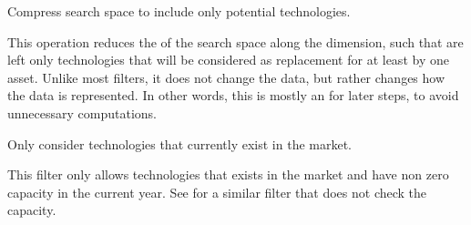 \documentclass[letterpaper,10pt,english]{sphinxmanual}
\begin{document}
\begin{fulllineitems}
\label{\detokenize{api:muse.filters.compress}}
Compress search space to include only potential technologies.

This operation reduces the  of the search space along the
 dimension, such that are left only technologies that
will be considered as replacement for at least by one asset. Unlike
most filters, it does not change the data, but rather changes how
the data is represented. In other words, this is mostly an
 for later steps, to avoid unnecessary computations.

\end{fulllineitems}


\begin{fulllineitems}
\label{\detokenize{api:muse.filters.currently_existing_tech}}
Only consider technologies that currently exist in the market.

This filter only allows technologies that exists in the market and have non\sphinxhyphen{} zero
capacity in the current year. See  for a similar filter
that does not check the capacity.

\end{fulllineitems}
\end{document}

